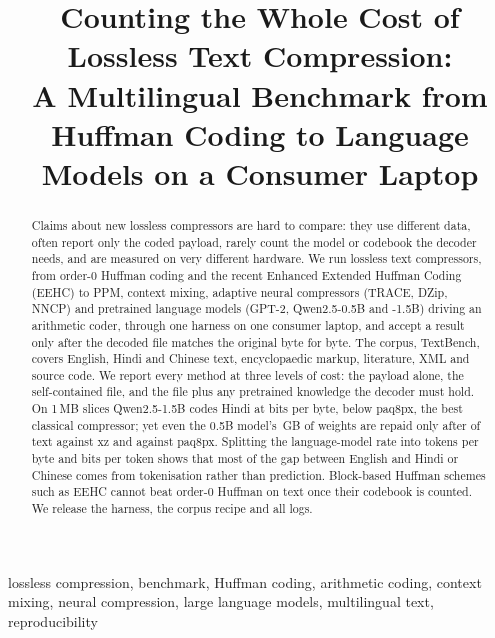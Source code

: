 \documentclass[conference]{IEEEtran}
\begin{document}
\title{Counting the Whole Cost of Lossless Text Compression:\\ A Multilingual Benchmark from Huffman Coding to Language Models on a Consumer Laptop}

\author{}

\maketitle

\begin{abstract}
Claims about new lossless compressors are hard to compare: they use different data, often report only the coded payload, rarely count the model or codebook the decoder needs, and are measured on very different hardware. We run \NumMethods{} lossless text compressors, from order-0 Huffman coding and the recent Enhanced Extended Huffman Coding (EEHC) to PPM, context mixing, adaptive neural compressors (TRACE, DZip, NNCP) and pretrained language models (GPT-2, Qwen2.5-0.5B and -1.5B) driving an arithmetic coder, through one harness on one consumer laptop, and accept a result only after the decoded file matches the original byte for byte. The corpus, TextBench, covers English, Hindi and Chinese text, encyclopaedic markup, literature, XML and source code. We report every method at three levels of cost: the payload alone, the self-contained file, and the file plus any pretrained knowledge the decoder must hold. On 1\,MB slices Qwen2.5-1.5B codes Hindi at \NumSQlHi{} bits per byte, \NumBestLLMgain{} below paq8px, the best classical compressor; yet even the 0.5B model's \NumQwenSmallGB{}\,GB of weights are repaid only after \NumBreakEvenSmall{} of text against xz and \NumBreakEvenSmallPaq{} against paq8px. Splitting the language-model rate into tokens per byte and bits per token shows that most of the gap between English and Hindi or Chinese comes from tokenisation rather than prediction. Block-based Huffman schemes such as EEHC cannot beat order-0 Huffman on text once their codebook is counted. We release the harness, the corpus recipe and all logs.
\end{abstract}

\begin{IEEEkeywords}
lossless compression, benchmark, Huffman coding, arithmetic coding, context mixing, neural compression, large language models, multilingual text, reproducibility
\end{IEEEkeywords}
\end{document}
